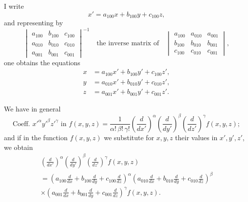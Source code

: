 \documentclass[11pt,a4paper]{article}
\begin{document}
\setcounter{page}{55}

I write
\[
x' = a_{100}x + b_{100}y + c_{100}z,
\]
and representing by
\[
\begin{vmatrix}
a_{100} & b_{100} & c_{100} \\
a_{010} & b_{010} & c_{010} \\
a_{001} & b_{001} & c_{001}
\end{vmatrix}^{-1}
\quad\text{the inverse matrix of}\quad
\begin{vmatrix}
a_{100} & a_{010} & a_{001} \\
b_{100} & b_{010} & b_{001} \\
c_{100} & c_{010} & c_{001}
\end{vmatrix},
\]
one obtains the equations
\begin{align*}
x &= a_{100}x' + b_{100}y' + c_{100}z', \\
y &= a_{010}x' + b_{010}y' + c_{010}z', \\
z &= a_{001}x' + b_{001}y' + c_{001}z'.
\end{align*}

We have in general
\[
\text{Coeff. } x'^\alpha y'^\beta z'^\gamma \text{ in } f(x,y,z)
= \frac{1}{\alpha!\,\beta!\,\gamma!}
\left(\frac{d}{dx'}\right)^\alpha
\left(\frac{d}{dy'}\right)^\beta
\left(\frac{d}{dz'}\right)^\gamma
f(x,y,z);
\]
and if in the function $f(x,y,z)$ we substitute for $x,y,z$ their values in $x',y',z'$, we obtain
\begin{multline*}
\left(\frac{d}{dx'}\right)^\alpha
\left(\frac{d}{dy'}\right)^\beta
\left(\frac{d}{dz'}\right)^\gamma f(x,y,z) \\
= \left(a_{100}\frac{d}{dx} + b_{100}\frac{d}{dy} + c_{100}\frac{d}{dz}\right)^\alpha
\left(a_{010}\frac{d}{dx} + b_{010}\frac{d}{dy} + c_{010}\frac{d}{dz}\right)^\beta \\
\times \left(a_{001}\frac{d}{dx} + b_{001}\frac{d}{dy} + c_{001}\frac{d}{dz}\right)^\gamma f(x,y,z).
\end{multline*}

\setcounter{page}{56}
\end{document}
